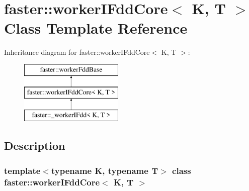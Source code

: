 \hypertarget{classfaster_1_1workerIFddCore}{}\section{faster\+:\+:worker\+I\+Fdd\+Core$<$ K, T $>$ Class Template Reference}
\label{classfaster_1_1workerIFddCore}
Inheritance diagram for faster\+:\+:worker\+I\+Fdd\+Core$<$ K, T $>$\+:\begin{figure}[H]
\begin{center}
\leavevmode
\includegraphics[height=3.000000cm]{classfaster_1_1workerIFddCore}
\end{center}
\end{figure}


\subsection{Description}
\subsubsection*{template$<$typename K, typename T$>$\newline
class faster\+::worker\+I\+Fdd\+Core$<$ K, T $>$}

